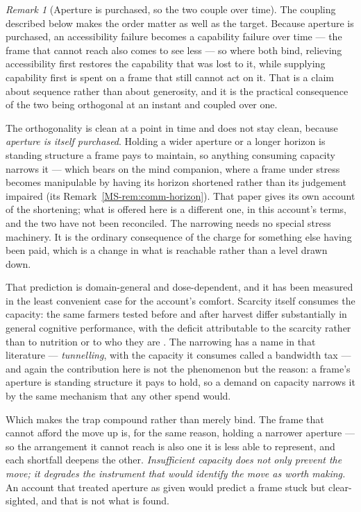 \documentclass[11pt,a4paper]{article}
\theoremstyle{remark}\newtheorem{remark}[definition]{Remark}
\begin{document}
\begin{remark}[Aperture is purchased, so the two couple over time]\label{rem:aperture-purchased}
The coupling described below makes the order matter as well as the target. Because aperture is
purchased, an accessibility failure becomes a capability failure over time --- the frame that cannot
reach also comes to see less --- so where both bind, relieving accessibility first restores the
capability that was lost to it, while supplying capability first is spent on a frame that still cannot
act on it. That is a claim about sequence rather than about generosity, and it is the practical
consequence of the two being orthogonal at an instant and coupled over one.

The orthogonality is clean at a point in time and does not stay clean, because \emph{aperture is itself
purchased}. Holding a wider aperture or a longer horizon is standing structure a frame pays to maintain,
so anything consuming capacity narrows it --- which bears on the mind companion, where a frame under
stress becomes manipulable by having its horizon shortened rather than its judgement impaired (its Remark~\ref{MS-rem:comm-horizon}). That
paper gives its own account of the shortening; what is offered here is a different one, in this
account's terms, and the two have not been reconciled. The narrowing needs no special stress machinery. It is the ordinary consequence
of the charge for something else having been paid, which is a change in what is reachable rather than a level drawn down.

That prediction is domain-general and dose-dependent, and it has been measured in the least convenient
case for the account's comfort. Scarcity itself consumes the capacity: the same farmers tested before
and after harvest differ substantially in general cognitive performance, with the deficit attributable
to the scarcity rather than to nutrition or to who they are \citep{mani2013}. The narrowing has a name
in that literature --- \emph{tunnelling}, with the capacity it consumes called a bandwidth tax
\citep{mullainathan2013} --- and again the contribution here is not the phenomenon but the reason: a
frame's aperture is standing structure it pays to hold, so a demand on capacity narrows it by the same
mechanism that any other spend would.

Which makes the trap compound rather than merely bind. The frame that cannot afford the move up is, for
the same reason, holding a narrower aperture --- so the arrangement it cannot reach is also one it is
less able to represent, and each shortfall deepens the other. \emph{Insufficient capacity does not only
prevent the move; it degrades the instrument that would identify the move as worth making.} An account
that treated aperture as given would predict a frame stuck but clear-sighted, and that is not what is
found.
\end{remark}
\end{document}
